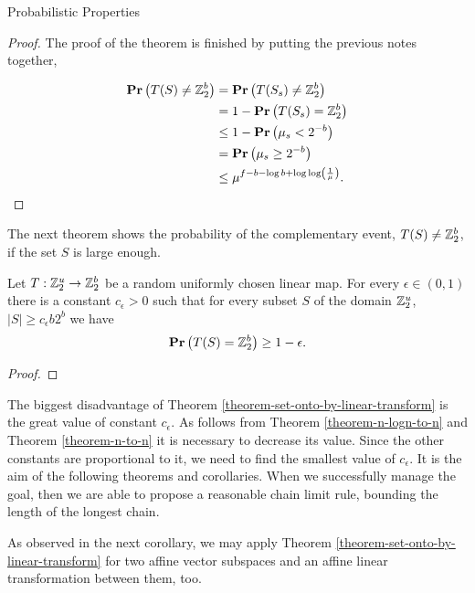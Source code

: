 \begin{section}{Probabilistic Properties}
\begin{proof}
The proof of the theorem is finished by putting the previous notes together,

\[
\begin{split}
\mathbf{Pr}\left(T(S) \neq \mathbb{Z}_{2}^{b}\right) 
	& = \mathbf{Pr}\left(T(S_s) \neq \mathbb{Z}_{2}^{b}\right)  \\
	& = 1 - \mathbf{Pr}\left(T(S_s) = \mathbb{Z}_{2}^{b}\right) \\
	& \leq 1 - \mathbf{Pr}\left(\mu_s < 2 ^ {-b}\right) \\
	& = \mathbf{Pr}\left(\mu_s \geq 2 ^ {-b}\right) \\
	& \leq \mu ^ {f - b - \log b + \log \log \left(\frac{1}{\mu}\right)} \text{.}
\end{split}
\]
\end{proof}

The next theorem shows the probability of the complementary event, $T(S) \neq \mathbb{Z}_{2}^{b}$, if the set $S$ is large enough.
\begin{theorem}
\label{theorem-set-onto-by-linear-transform}
Let $T: \mathbb{Z}_{2}^{u} \rightarrow \mathbb{Z}_{2}^{b}$ be a random uniformly chosen linear map. For every $\epsilon \in (0, 1)$ there is a constant $c_\epsilon > 0$ such that for every subset $S$ of the domain $\mathbb{Z}_{2}^{u}$, $|S| \geq c_\epsilon b 2 ^ b$ we have
\[
	\mathbf{Pr}\left(T(S) = \mathbb{Z}_{2}^{b}\right) \geq 1 - \epsilon \text{.}
\]
\end{theorem}
\begin{proof}

\end{proof}

The biggest disadvantage of Theorem \ref{theorem-set-onto-by-linear-transform} is the great value of constant $c_{\epsilon}$. As follows from Theorem \ref{theorem-n-logn-to-n} and Theorem \ref{theorem-n-to-n} it is necessary to decrease its value. Since the other constants are proportional to it, we need to find the smallest value of $c_{\epsilon}$. It is the aim of the following theorems and corollaries. When we successfully manage the goal, then we are able to propose a reasonable chain limit rule, bounding the length of the longest chain.
\end{section}

As observed in the next corollary, we may apply Theorem \ref{theorem-set-onto-by-linear-transform} for two affine vector subspaces and an affine linear transformation between them, too.

